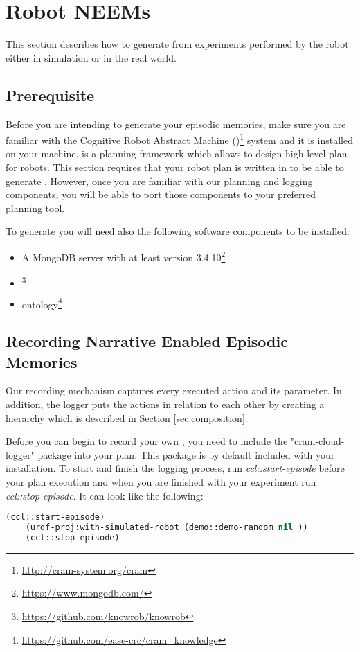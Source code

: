 \section{Robot NEEMs}
\label{sec:robot-neem}
\lstset{style=lispcode}
This section describes how to generate \neems from experiments performed by the robot either in simulation or in the real world. 

\subsection{Prerequisite}

Before you are intending to generate your episodic memories, make sure you are familiar with the Cognitive Robot Abstract Machine (\cram)\footnote{\url{http://cram-system.org/cram}} system and it is installed on your machine.
\cram is a planning framework which allows to design high-level plan for robots.
This section requires that your robot plan is written in \cram to be able to generate \neems.
However, once you are familiar with our planning and logging components, you will be able to port those components to your preferred planning tool.

To generate \neems  you will need also the following software components to be installed:

\begin{itemize}
	\item A MongoDB server with at least version 3.4.10\footnote{\url{https://www.mongodb.com/}}
	\item \knowrob\footnote{\url{https://github.com/knowrob/knowrob}}
	\item \cram ontology\footnote{\url{https://github.com/ease-crc/cram\_knowledge}}
\end{itemize}


\subsection{Recording Narrative Enabled Episodic Memories}
Our recording mechanism  captures every executed \cram action and its parameter.
In addition, the logger puts the actions in relation to each other by creating a hierarchy which is described in Section \ref{sec:composition}.

Before you can begin to record your own \neems, you need to include the "cram-cloud-logger" package into your \cram plan.
This package is by default included with your \cram installation.
To start and finish the logging process, run \textit{ccl::start-episode} before your plan execution and when you are finished with your experiment run \textit{ccl::stop-episode}.
It can look like the following:
\begin{lstlisting}[language=lisp, caption=Steps to Record an Episode for a \cram Plan]
	(ccl::start-episode)
	(urdf-proj:with-simulated-robot (demo::demo-random nil ))
	(ccl::stop-episode)
\end{lstlisting}
	
